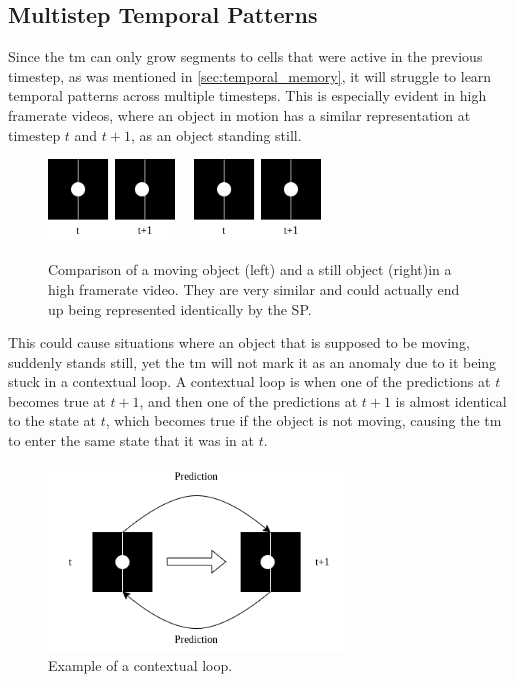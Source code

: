 \subsection{Multistep Temporal Patterns}
\label{sec:multistep_temporal_patterns}
Since the \gls*{tm} can only grow segments to cells that were active in the previous timestep, as was mentioned in \autoref{sec:temporal_memory}, it will struggle to learn temporal patterns across multiple timesteps. This is especially evident in high framerate videos, where an object in motion has a similar representation at timestep $t$ and $t+1$, as an object standing still.
\begin{figure}[H]
    \centering
    \includegraphics[width=0.3\textwidth]{resources/methodology/high_fps_moving.png}
    \unskip\ \vrule\
    \includegraphics[width=0.3\textwidth]{resources/methodology/high_fps_still.png}
    \caption[Comparison of a Moving Object in a High Framerate Video]{Comparison of a moving object (left) and a still object (right)in a high framerate video. They are very similar and could actually end up being represented identically by the SP.}
\end{figure}
This could cause situations where an object that is supposed to be moving, suddenly stands still, yet the \gls*{tm} will not mark it as an anomaly due to it being stuck in a contextual loop. A contextual loop is when one of the predictions at $t$ becomes true at $t+1$, and then one of the predictions at $t+1$ is almost identical to the state at $t$, which becomes true if the object is not moving, causing the \gls*{tm} to enter the same state that it was in at $t$.
\begin{figure}[H]
    \centering
    \includegraphics[width=0.7\textwidth]{resources/methodology/contextual_loop.png}
    \caption[Contextual Loop Example]{Example of a contextual loop.}
\end{figure}
